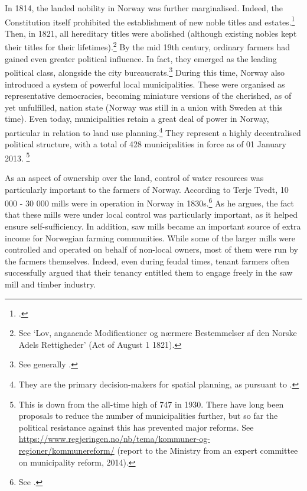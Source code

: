 In 1814, the landed nobility in Norway was further marginalised. Indeed, the Constitution itself prohibited the establishment of new noble titles and estates.\footcite[23|118]{c14} Then, in 1821, all hereditary titles were abolished (although existing nobles kept their titles for their lifetimes).\footnote{See `Lov, angaaende Modificationer og nærmere Bestemmelser af den Norske Adels Rettigheder' (Act of August 1 1821).} By the mid 19th century, ordinary farmers had gained even greater political influence. In fact, they emerged as the leading political class, alongside the city bureaucrats.\footnote{See generally \cite{hommerstad14}.} During this time, Norway also introduced a system of powerful local municipalities. These were organised as representative democracies, becoming miniature versions of the cherished, as of yet unfulfilled, nation state (Norway was still in a union with Sweden at this time). Even today, municipalities retain a great deal of power in Norway, particular in relation to land use planning.\footnote{They are the primary decision-makers for spatial planning, as pursuant to \cite{pb08}.} They represent a highly decentralised political structure, with a total of 428 municipalities in force as of 01 January 2013. \footnote{This is down from the all-time high of 747 in 1930. There have long been proposals to reduce the number of municipalities further, but so far the political resistance against this has prevented major reforms. See \url{https://www.regjeringen.no/nb/tema/kommuner-og-regioner/kommunereform/} (report to the Ministry from an expert committee on municipality reform, 2014).}

As an aspect of ownership over the land, control of water resources was particularly important to the farmers of Norway. According to Terje Tvedt, 10 000 - 30 000 mills were in operation in Norway in 1830s.\footnote{See \cite[121]{tvedt13}.} As he argues, the fact that these mills were under local control was particularly important, as it helped ensure self-sufficiency. In addition, saw mills became an important source of extra income for Norwegian farming communities. While some of the larger mills were controlled and operated on behalf of non-local owners, most of them were run by the farmers themselves. Indeed, even during feudal times, tenant farmers often successfully argued that their tenancy entitled them to engage freely in the saw mill and timber industry.

